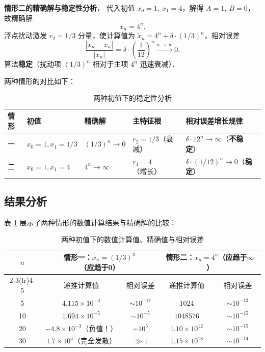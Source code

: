 \documentclass[UTF8,a4paper,11pt]{article}
\begin{document}
\noindent\textbf{情形二的精确解与稳定性分析．}
代入初值 $x_0 = 1,\ x_1 = 4$，解得 $A = 1,\ B = 0$，故精确解
$$x_n = 4^n.$$
浮点扰动激发 $r_2 = 1/3$ 分量，使计算值为 $\tilde{x}_n = 4^n + \delta\cdot(1/3)^n$，相对误差
$$\frac{|\tilde{x}_n - x_n|}{|x_n|} = \delta\cdot\left(\frac{1}{12}\right)^n \xrightarrow{n\to\infty} 0.$$
算法\textbf{稳定}（扰动项 $(1/3)^n$ 相对于主项 $4^n$ 迅速衰减）．

两种情形的对比如下：

\begin{table}[H]
\centering
\caption{两种初值下的稳定性分析}
\begin{tabular}{lllll}
\toprule
情形 & 初值 & 精确解 & 主特征根 & 相对误差增长规律 \\
\midrule
一 & $x_0=1,x_1=1/3$ & $(1/3)^n \to 0$ & $r_2 = 1/3$（衰减） & $\delta \cdot 12^n \to \infty$（\textbf{不稳定}）\\
二 & $x_0=1,x_1=4$   & $4^n \to \infty$ & $r_1 = 4$（增长）   & $\delta \cdot (1/12)^n \to 0$（\textbf{稳定}）\\
\bottomrule
\end{tabular}
\end{table}

\subsection{结果分析}

表 \ref{tab:p4} 展示了两种情形的数值计算结果与精确解的比较：

\begin{table}[H]
\centering
\caption{两种初值下的数值计算值、精确值与相对误差}
\label{tab:p4}
\small
\begin{tabular}{ccccc}
\toprule
\multirow{2}{*}{$n$} & \multicolumn{2}{c}{情形一：$x_n = (1/3)^n$（应趋于0）} & \multicolumn{2}{c}{情形二：$x_n = 4^n$（应趋于$\infty$）} \\
\cmidrule(lr){2-3}\cmidrule(lr){4-5}
 & 递推计算值 & 相对误差 & 递推计算值 & 相对误差 \\
\midrule
5  & $4.115\times10^{-3}$ & $\sim 10^{-11}$ & $1024$ & $\sim 10^{-13}$ \\
10 & $1.694\times10^{-5}$ & $\sim 10^{-5}$ & $1048576$ & $\sim 10^{-15}$ \\
20 & $-4.8\times10^{-3}$（负值！）& $\sim 10^{5}$ & $1.10\times10^{12}$ & $\sim 10^{-15}$ \\
30 & $1.7\times10^{4}$（完全发散）& $\gg 1$ & $1.15\times10^{18}$ & $\sim 10^{-14}$ \\
\bottomrule
\end{tabular}
\end{table}
\end{document}

